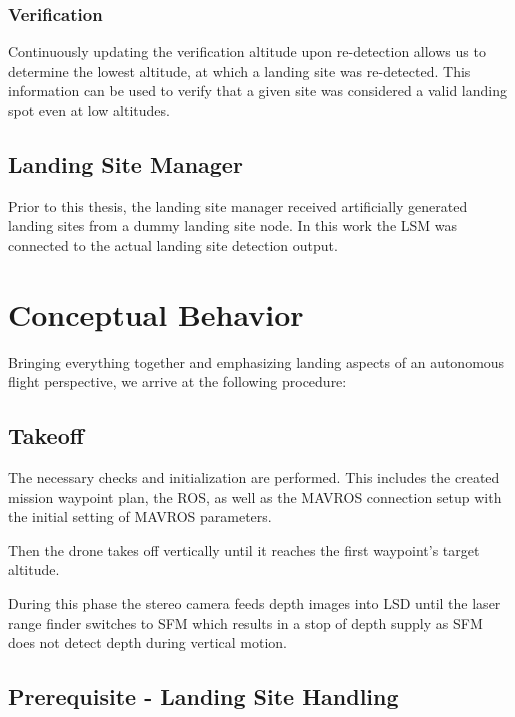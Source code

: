 \subsubsection{Verification}

Continuously updating the verification altitude upon re-detection allows us to determine the lowest altitude, at which a landing site was re-detected. This information can be used to verify that a given site was considered a valid landing spot even at low altitudes. 

\subsection{Landing Site Manager}

Prior to this thesis, the landing site manager received artificially generated landing sites from a dummy landing site node. In this work the LSM was connected to the actual landing site detection output. 


\section{Conceptual Behavior}

Bringing everything together and emphasizing landing aspects of an autonomous flight perspective, we arrive at the following procedure:

\subsection{Takeoff}

The necessary checks and initialization are performed. This includes the created mission waypoint plan, the ROS, as well as the MAVROS connection setup with the initial setting of MAVROS parameters.

Then the drone takes off vertically until it reaches the first waypoint's target altitude.

During this phase the stereo camera feeds depth images into LSD until the laser range finder switches to SFM which results in a stop of depth supply as SFM does not detect depth during vertical motion.

\subsection{Prerequisite - Landing Site Handling}


